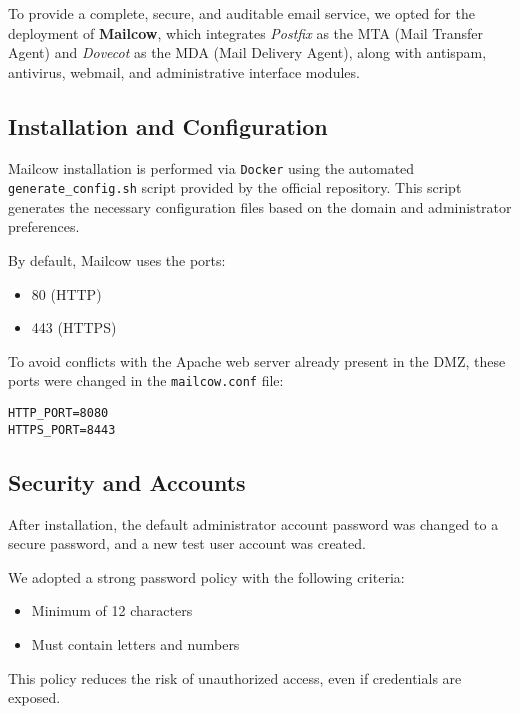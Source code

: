 \documentclass[12pt]{report}
\begin{document}
To provide a complete, secure, and auditable email service, we opted for the deployment of \textbf{Mailcow}, which integrates \textit{Postfix} as the MTA (Mail Transfer Agent) and \textit{Dovecot} as the MDA (Mail Delivery Agent), along with antispam, antivirus, webmail, and administrative interface modules.

\subsection*{Installation and Configuration}

Mailcow installation is performed via \texttt{Docker} using the automated \texttt{generate\_config.sh} script provided by the official repository. This script generates the necessary configuration files based on the domain and administrator preferences.

By default, Mailcow uses the ports:
\begin{itemize}
    \item 80 (HTTP)
    \item 443 (HTTPS)
\end{itemize}

To avoid conflicts with the Apache web server already present in the DMZ, these ports were changed in the \texttt{mailcow.conf} file:

\begin{lstlisting}[caption={Port Changes in mailcow.conf}]
HTTP_PORT=8080
HTTPS_PORT=8443
\end{lstlisting}

\subsection*{Security and Accounts}

After installation, the default administrator account password was changed to a secure password, and a new test user account was created.

We adopted a strong password policy with the following criteria:
\begin{itemize}
    \item Minimum of 12 characters
    \item Must contain letters and numbers
\end{itemize}

This policy reduces the risk of unauthorized access, even if credentials are exposed.
\end{document}
